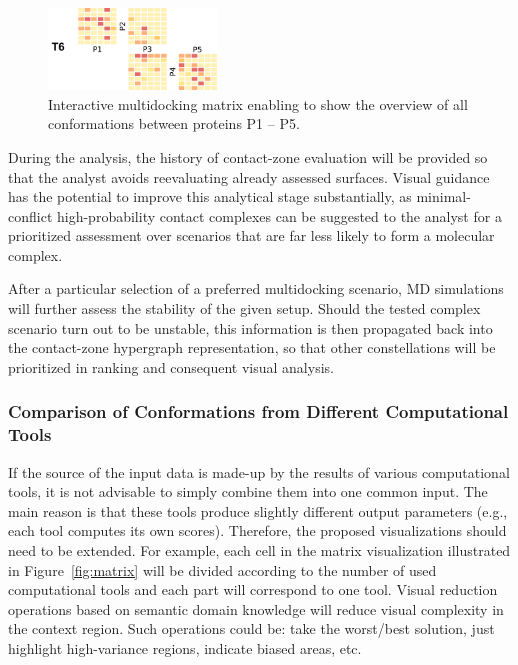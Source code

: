 \documentclass[11pt,a4paper,titlepage,oneside,onecolumn]{article}
\begin{document}
\begin{figure}
  \begin{center}
    \includegraphics[width=0.4\textwidth]{pics/multidock2.png}
  \end{center}
  \caption{Interactive multidocking matrix enabling to show the overview of all conformations between proteins P1 -- P5.}
  \label{fig:multidock2}
\end{figure}

During the analysis, the history of contact-zone evaluation will be provided so that the analyst avoids reevaluating already assessed surfaces. 
Visual guidance has the potential to improve this analytical stage substantially, as minimal-conflict high-probability contact complexes can be suggested to the analyst for a prioritized assessment over scenarios that are far less likely to form a molecular complex.

After a particular selection of a preferred multidocking scenario, MD simulations will further assess the stability of the given setup. 
Should the tested complex scenario turn out to be unstable, this information is then propagated back into the contact-zone hypergraph representation, so that other constellations will be prioritized in ranking and consequent visual analysis.

\subsubsection{Comparison of Conformations from Different Computational Tools}
If the source of the input data is made-up by the results of various computational tools, it is not advisable to simply combine them into one common input.
The main reason is that these tools produce slightly different output parameters (e.g., each tool computes its own scores). 
Therefore, the proposed visualizations should need to be extended. 
For example, each cell in the matrix visualization illustrated in Figure~\ref{fig:matrix} will be divided according to the number of used computational tools and each part will correspond to one tool.
Visual reduction operations based on semantic domain knowledge will reduce visual complexity in the context region.
Such operations could be: take the worst/best solution, just highlight high-variance regions, indicate biased areas, etc.
\end{document}
